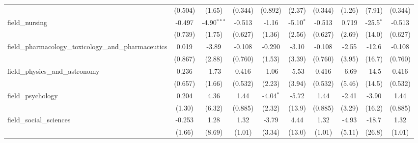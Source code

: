 \begin{tabular}{lccccccccc}
                                                               & (0.504)        & (1.65)        & (0.344)        & (0.892)        & (2.37)       & (0.344)        & (1.26)        & (7.91)        & (0.344)\\   
   field\_nursing                                              & -0.497         & -4.90$^{***}$ & -0.513         & -1.16          & -5.10$^{*}$  & -0.513         & 0.719         & -25.5$^{*}$   & -0.513\\   
                                                               & (0.739)        & (1.75)        & (0.627)        & (1.36)         & (2.56)       & (0.627)        & (2.69)        & (14.0)        & (0.627)\\   
   field\_pharmacology\_toxicology\_and\_pharmaceutics         & 0.019          & -3.89         & -0.108         & -0.290         & -3.10        & -0.108         & -2.55         & -12.6         & -0.108\\   
                                                               & (0.867)        & (2.88)        & (0.760)        & (1.53)         & (3.39)       & (0.760)        & (3.95)        & (16.7)        & (0.760)\\   
   field\_physics\_and\_astronomy                              & 0.236          & -1.73         & 0.416          & -1.06          & -5.53        & 0.416          & -6.69         & -14.5         & 0.416\\   
                                                               & (0.657)        & (1.66)        & (0.532)        & (2.23)         & (3.94)       & (0.532)        & (5.46)        & (14.5)        & (0.532)\\   
   field\_psychology                                           & 0.204          & 4.36          & 1.44           & -4.04$^{*}$    & -5.72        & 1.44           & -2.41         & -3.90         & 1.44\\   
                                                               & (1.30)         & (6.32)        & (0.885)        & (2.32)         & (13.9)       & (0.885)        & (3.29)        & (16.2)        & (0.885)\\   
   field\_social\_sciences                                     & -0.253         & 1.28          & 1.32           & -3.79          & 4.44         & 1.32           & -4.93         & -18.7         & 1.32\\   
                                                               & (1.66)         & (8.69)        & (1.01)         & (3.34)         & (13.0)       & (1.01)         & (5.11)        & (26.8)        & (1.01)\\   

\end{tabular}
